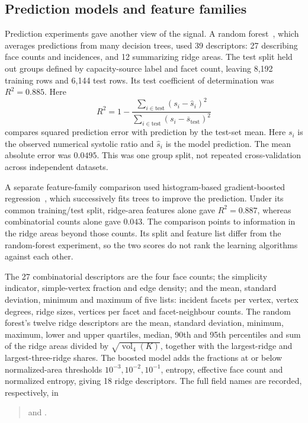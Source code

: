 \subsection{Prediction models and feature families}\label{app:ds-prediction}


Prediction experiments gave another view of the signal. A random forest~\cite{dsBreiman2001},
which averages predictions from many decision trees, used 39 descriptors:
27 describing face counts and incidences, and 12 summarizing ridge areas.
The test split held out groups defined by capacity-source label and facet
count, leaving 8,192 training rows and 6,144 test rows. Its test coefficient
of determination was $R^2=0.885$. Here
\[
 R^2=1-\frac{\sum_{i\in\mathrm{test}}(s_i-\widehat s_i)^2}
                   {\sum_{i\in\mathrm{test}}(s_i-\overline s_{\mathrm{test}})^2}
\]
compares squared prediction error with prediction by the test-set mean.
Here $s_i$ is the observed numerical systolic ratio and $\widehat s_i$
is the model prediction.
The mean absolute error was $0.0495$. This was one group split, not repeated
cross-validation across independent datasets.

A separate feature-family comparison used histogram-based gradient-boosted
regression~\cite{dsSklearnHGB}, which successively fits trees to improve the prediction. Under
its common training/test split, ridge-area features alone gave $R^2=0.887$,
whereas combinatorial counts alone gave $0.043$. The comparison points to
information in the ridge areas beyond those counts. Its split and feature
list differ from the random-forest experiment, so the two scores do not rank
the learning algorithms against each other.

The 27 combinatorial descriptors are the four face counts; the simplicity
indicator, simple-vertex fraction and edge density; and the mean, standard
deviation, minimum and maximum of five lists: incident facets per vertex,
vertex degrees, ridge sizes, vertices per facet and facet-neighbour counts.
The random forest's twelve ridge descriptors are the mean, standard deviation,
minimum, maximum, lower and upper quartiles, median, 90th and 95th percentiles and sum of the
ridge areas divided by $\sqrt{\operatorname{vol}_4(K)}$, together with the
largest-ridge and largest-three-ridge shares. The boosted model adds the
fractions at or below normalized-area thresholds $10^{-3},10^{-2},10^{-1}$,
entropy, effective face count and normalized entropy, giving 18 ridge
descriptors. The full field names are recorded, respectively, in
\begin{quote}
\small\raggedright
{}
and .
\end{quote}

